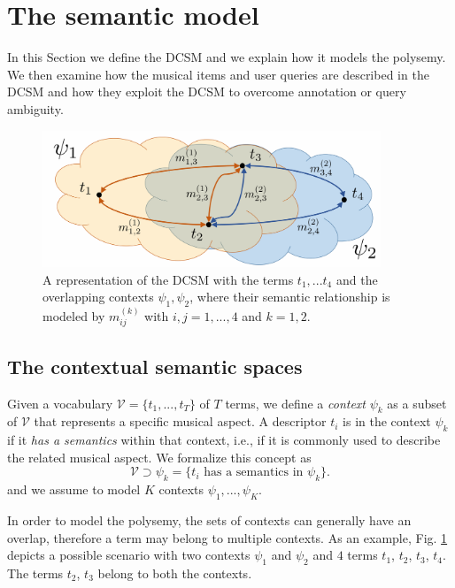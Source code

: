 \section{The semantic model}
\label{sec:DCSMoverview}
In this Section we define the DCSM and we explain how it models the polysemy. We then examine how the musical items and user queries are described in the DCSM and how they exploit the DCSM to overcome annotation or query ambiguity.


\begin{figure}[tbp]
        \centering
         \includegraphics[width=0.9\textwidth]{img/DCSM/DCSM1}
        \caption{A representation of the DCSM with the terms $t_1, ... t_4$ and the overlapping contexts $\psi_1, \psi_2$, where their semantic relationship is modeled by $m_{ij}^{(k)}$ with $i, j=1,...,4$ and $k=1,2$.  %
        }
    \label{fig:DCSMmodel}
\end{figure}

\subsection{The contextual semantic spaces}
Given a vocabulary $\mathcal{V}=\{t_1, ..., t_{T} \}$ of $T$ terms, we define a \textit{context} $\psi_k$ as a subset of $\mathcal{V}$ that represents a specific musical aspect. A descriptor $t_i$ is in the context $\psi_k$ if it \textit{has a semantics} within that context, i.e., if it is commonly used to describe the related musical aspect. We formalize this concept as 
\begin{equation}
\mathcal{V} \supset \psi_k = \{t_i \text{ has a semantics in } \psi_k \}.
\end{equation}
and we assume to model $K$ contexts $\psi_1, ..., \psi_K$.

In order to model the polysemy, the sets of contexts can generally have an overlap, therefore a term may belong to multiple contexts. 
As an example, Fig. \ref{fig:DCSMmodel} depicts a possible scenario with two contexts $\psi_1$ and $\psi_2$ and $4$ terms $t_1$, $t_2$, $t_3$, $t_4$. The terms $t_2$, $t_3$ belong to both the contexts.

